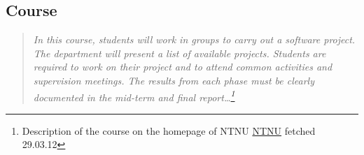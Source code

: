     \subsection{Course}\label{Course}
    \begin{quotation}
    \em In this course, students will work in groups to carry out a software project. The department will present a list of available projects. Students are required to work on their project and to attend common activities and supervision meetings. The results from each phase must be clearly documented in the mid-term and final report\ldots\footnote{Description of the course on the homepage of NTNU \href{http://www.ntnu.edu/studies/courses/IT2901}{NTNU} fetched 29.03.12}
    \end{quotation}
